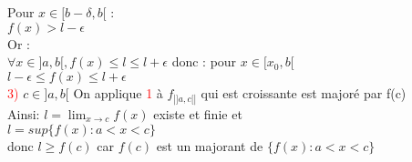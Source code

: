 \documentclass{article}
\begin{document}
Pour $x \in [b-\delta,b[$ : \\ 
$f(x)> l- \epsilon$ \\ 
Or : \\ 
$\forall x \in ]a,b[,f(x) \leq l \leq l+ \epsilon$
donc : pour $x \in [x_0,b[$ \\ 
$l- \epsilon \leq f(x) \leq l+ \epsilon$ \\ 
\textcolor{red}{3)} $c \in ]a,b[$
On applique \textcolor{red}{1} à $f_{|]a,c[|}$ qui est croissante est majoré par f(c) \\ 
Ainsi: $l=\lim_{x \rightarrow c}f(x)$ existe et finie et \\ 
$l=sup\lbrace f(x) :a<x<c \rbrace$ \\ 
donc $l \geq f(c)$ car $f(c)$ est un majorant de $\lbrace f(x) :a<x<c \rbrace$
\end{document}

